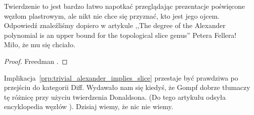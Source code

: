 Twierdzenie to jest bardzo łatwo napotkać przeglądając prezentacje poświęcone węzłom plastrowym, ale nikt nie chce się przyznać, kto jest jego ojcem.
Odpowiedź znaleźliśmy dopiero w artykule ,,The degree of the Alexander polynomial is an upper bound for the topological slice genus'' Petera Fellera!
Miło, że mu się chciało.

\begin{proof}
%
    Freedman \cite[tw. 1.13]{freedman1982}.
\end{proof}

Implikacja~\ref{prp:trivial_alexander_implies_slice} przestaje być prawdziwa po przejściu do kategorii Diff.
Wydawało nam się kiedyś, że Gompf \cite{gompf1986} dobrze tłumaczy tę różnicę przy użyciu twierdzenia Donaldsona.
%
%
(Do tego artykułu odsyła encyklopedia węzłów \cite{adams2021}).
Dzisiaj wiemy, że nic nie wiemy.











